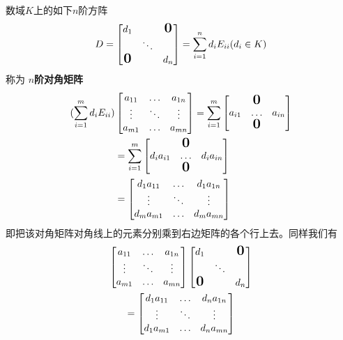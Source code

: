 \documentclass[11pt]{article}
\begin{document}
数域\(K\)上的如下\(n\)阶方阵
\begin{equation*}
D=
\begin{bmatrix}
d_1&&\mbox{\normalfont\Large\bfseries 0}\\
&\ddots&\\
\mbox{\normalfont\Large\bfseries 0}&&d_n
\end{bmatrix}=
\sum_{i=1}^nd_iE_{ii}(d_i\in K)
\end{equation*}
称为 \textbf{\(n\)阶对角矩阵}
\begin{align*}
(\sum_{i=1}^md_iE_{ii})&
\begin{bmatrix}
a_{11}&\dots&a_{1n}\\
\vdots&\ddots&\vdots\\
a_{m1}&\dots&a_{mn}\\
\end{bmatrix}=
\sum_{i=1}^m
\begin{bmatrix}
&\mbox{\normalfont\Large\bfseries 0}&\\
a_{i1}&\dots&a_{in}\\
&\mbox{\normalfont\Large\bfseries 0}&\\
\end{bmatrix}\\
&=\sum_{i=1}^m
\begin{bmatrix}
&\mbox{\normalfont\Large\bfseries 0}&\\
d_ia_{i1}&\dots&d_ia_{in}\\
&\mbox{\normalfont\Large\bfseries 0}&\\
\end{bmatrix}\\
&=
\begin{bmatrix}
d_1a_{11}&\dots&d_1a_{1n}\\
\vdots&\ddots&\vdots\\
d_ma_{m1}&\dots&d_{m}a_{mn}
\end{bmatrix}
\end{align*}
即把该对角矩阵对角线上的元素分别乘到右边矩阵的各个行上去。同样我们有
\begin{gather*}
\begin{bmatrix}
a_{11}&\dots&a_{1n}\\
\vdots&\ddots&\vdots\\
a_{m1}&\dots&a_{mn}\\
\end{bmatrix}
\begin{bmatrix}
d_1&&\mbox{\normalfont\Large\bfseries 0}\\
&\ddots&\\
\mbox{\normalfont\Large\bfseries 0}&&d_n
\end{bmatrix}\\
=
\begin{bmatrix}
d_1a_{11}&\dots&d_na_{1n}\\
\vdots&\ddots&\vdots\\
d_1a_{m1}&\dots&d_na_{mn}
\end{bmatrix}
\end{gather*}
\end{document}
